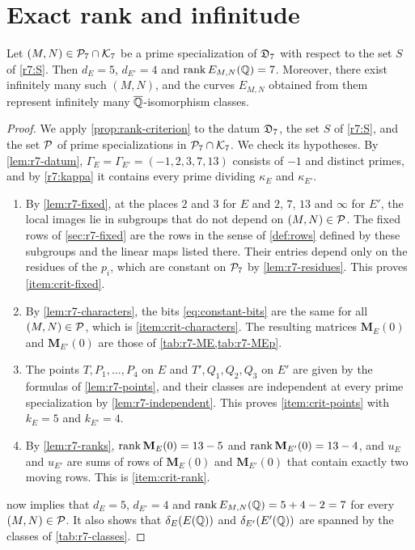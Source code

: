 \section{Exact rank and infinitude}\label{sec:r7-theorem}

\begin{theorem}\label{thm:r7}
Let $(M,N)\in\mathcal P_7\cap\mathcal K_7$ be a prime specialization of $\mathfrak D_7$
with respect to the set $S$ of \eqref{r7:S}. Then $d_E=5$, $d_{E'}=4$ and
$\operatorname{rank} E_{M,N}(\mathbb Q)=7$. Moreover, there exist infinitely many such $(M,N)$,
and the curves $E_{M,N}$ obtained from them represent infinitely many
$\overline{\mathbb Q}$-isomorphism classes.
\end{theorem}

\begin{proof}
We apply \cref{prop:rank-criterion} to the datum $\mathfrak D_7$, the set $S$ of
\eqref{r7:S}, and the set $\mathcal P$ of prime specializations in
$\mathcal P_7\cap\mathcal K_7$. We check its hypotheses.
By \cref{lem:r7-datum}, $\Gamma_E=\Gamma_{E'}=(-1,2,3,7,13)$ consists of
$-1$ and distinct primes, and by \eqref{r7:kappa} it contains every prime
dividing $\kappa_E$ and $\kappa_{E'}$.
\begin{enumerate}[label=(\roman*)]
\item By \cref{lem:r7-fixed}, at the places $2$ and $3$ for $E$ and $2$,
$7$, $13$ and $\infty$ for $E'$, the local images lie in subgroups that do
not depend on $(M,N)\in\mathcal P$. The fixed rows of \cref{sec:r7-fixed} are the rows
in the sense of \cref{def:rows} defined by these subgroups and the linear
maps listed there. Their entries depend only on the residues of the $p_i$,
which are constant on $\mathcal P_7$ by \cref{lem:r7-residues}. This proves
\ref{item:crit-fixed}.
\item By \cref{lem:r7-characters}, the bits \eqref{eq:constant-bits} are
the same for all $(M,N)\in\mathcal P$, which is \ref{item:crit-characters}. The
resulting matrices $\mathbf M_E(0)$ and $\mathbf M_{E'}(0)$ are those of
\cref{tab:r7-ME,tab:r7-MEp}.
\item The points $T,P_1,\dots,P_4$ on $E$ and $T',Q_1,Q_2,Q_3$ on $E'$ are
given by the formulas of \cref{lem:r7-points}, and their classes are
independent at every prime specialization by \cref{lem:r7-independent}.
This proves \ref{item:crit-points} with $k_E=5$ and $k_{E'}=4$.
\item By \cref{lem:r7-ranks}, $\operatorname{rank}\mathbf M_E(0)=13-5$ and
$\operatorname{rank}\mathbf M_{E'}(0)=13-4$, and $u_E$ and $u_{E'}$ are sums of rows of
$\mathbf M_E(0)$ and $\mathbf M_{E'}(0)$ that contain exactly two moving
rows. This is \ref{item:crit-rank}.
\end{enumerate}
 now implies that $d_E=5$, $d_{E'}=4$ and
$\operatorname{rank} E_{M,N}(\mathbb Q)=5+4-2=7$ for every $(M,N)\in\mathcal P$. It also shows that
$\delta_E(E(\mathbb Q))$ and $\delta_{E'}(E'(\mathbb Q))$ are spanned by the classes of
\cref{tab:r7-classes}.


\end{proof}
